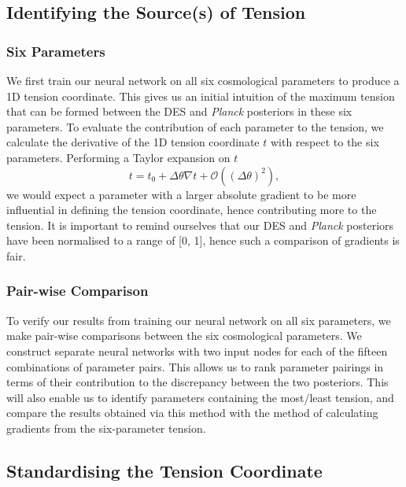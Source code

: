 \documentclass[%
 reprint,
 amsmath,amssymb,
 aps,
]{revtex4-2}
\begin{document}
\subsection{Identifying the Source(s) of Tension} \label{section:source}

\subsubsection{Six Parameters}

We first train our neural network on all six cosmological parameters to produce a 1D tension coordinate. This gives us an initial intuition of the maximum tension that can be formed between the DES and \textit{Planck} posteriors in these six parameters. To evaluate the contribution of each parameter to the tension, we calculate the derivative of the 1D tension coordinate $t$ with respect to the six parameters. Performing a Taylor expansion on $t$
\begin{equation}
    t = t_0 + \Delta \theta \nabla t + \mathcal{O}((\Delta \theta)^2),
\end{equation}
we would expect a parameter with a larger absolute gradient to be more influential in defining the tension coordinate, hence contributing more to the tension. It is important to remind ourselves that our DES and \textit{Planck} posteriors have been normalised to a range of [0, 1], hence such a comparison of gradients is fair.

\subsubsection{Pair-wise Comparison}

To verify our results from training our neural network on all six parameters, we make pair-wise comparisons between the six cosmological parameters. We construct separate neural networks with two input nodes for each of the fifteen combinations of parameter pairs. This allows us to rank parameter pairings in terms of their contribution to the discrepancy between the two posteriors. This will also enable us to identify parameters containing the most/least tension, and compare the results obtained via this method with the method of calculating gradients from the six-parameter tension.


\subsection{Standardising the Tension Coordinate}
\end{document}
